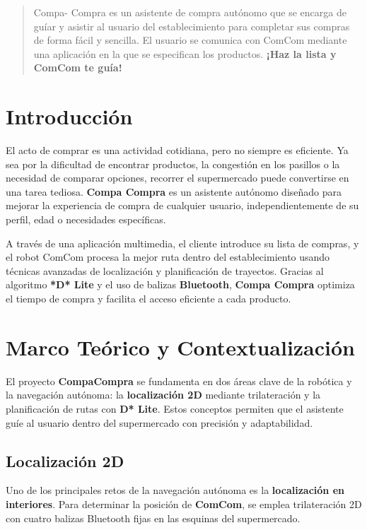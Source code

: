 \documentclass[a4paper,12pt]{article}
\begin{document}
\tableofcontents

\begin{abstract}
Compa- Compra es un asistente de compra autónomo que se encarga de guíar y asistir al usuario del establecimiento para completar sus compras de forma fácil y sencilla. El usuario se comunica con ComCom mediante una aplicación en la que se especifican los productos.
\textbf{¡Haz la lista y ComCom te guía!}
\end{abstract}

\section{Introducción}
El acto de comprar es una actividad cotidiana, pero no siempre es eficiente. 
Ya sea por la dificultad de encontrar productos, la congestión en los 
pasillos o la necesidad de comparar opciones, recorrer el supermercado 
puede convertirse en una tarea tediosa. \textbf{ Compa Compra } es un asistente 
autónomo diseñado para mejorar la experiencia de compra de cualquier usuario, 
independientemente de su perfil, edad o necesidades específicas.  

A través de una aplicación multimedia, el cliente introduce su lista de 
compras, y el robot ComCom procesa la mejor ruta dentro del establecimiento 
usando técnicas avanzadas de localización y planificación de trayectos. 
Gracias al algoritmo \textbf{*D* Lite} y el uso de balizas \textbf{Bluetooth}, \textbf{ Compa Compra } 
optimiza el tiempo de compra y facilita el acceso eficiente a cada producto.  

\section{Marco Teórico y Contextualización}

El proyecto \textbf{CompaCompra} se fundamenta en dos áreas clave de la robótica y la navegación autónoma: la \textbf{localización 2D} mediante trilateración y la planificación de rutas con \textbf{D* Lite}. Estos conceptos permiten que el asistente guíe al usuario dentro del supermercado con precisión y adaptabilidad.

\subsection{Localización 2D}
Uno de los principales retos de la navegación autónoma es la \textbf{localización en interiores}. Para determinar la posición de \textbf{ComCom}, se emplea trilateración 2D con cuatro balizas Bluetooth fijas en las esquinas del supermercado.
\end{document}
